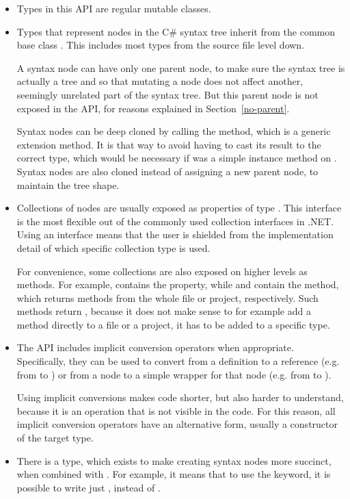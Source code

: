 \begin{itemize}
	
\item Types in this \ac{API} are regular mutable classes.

\item Types that represent nodes in the C\# syntax tree inherit from the common base class . This includes most types from the source file level down.

A syntax node can have only one parent node, to make sure the syntax tree is actually a tree and so that mutating a node does not affect another, seemingly unrelated part of the syntax tree. But this parent node is not exposed in the \ac{API}, for reasons explained in Section~\ref{no-parent}.

Syntax nodes can be deep cloned by calling the  method, which is a generic extension method. It is that way to avoid having to cast its result to the correct type, which would be necessary if  was a simple instance method on . Syntax nodes are also cloned instead of assigning a new parent node, to maintain the tree shape.

\item Collections of nodes are usually exposed as properties of type . This interface is the most flexible out of the commonly used collection interfaces in .NET. Using an interface means that the user is shielded from the implementation detail of which specific collection type is used.

For convenience, some collections are also exposed on higher levels as methods. For example,  contains the  property, while  and  contain the  method, which returns methods from the whole file or project, respectively. Such methods return , because it does not make sense to for example add a method directly to a file or a project, it has to be added to a specific type.

\item The \ac{API} includes implicit conversion operators when appropriate. Specifically, they can be used to convert from a definition to a reference (e.g. from  to ) or from a node to a simple wrapper for that node (e.g. from  to ).

Using implicit conversions makes code shorter, but also harder to understand, because it is an operation that is not visible in the code. For this reason, all implicit conversion operators have an alternative form, usually a constructor of the target type.

\item There is a  type, which exists to make creating syntax nodes more succinct, when combined with . For example, it means that to use the  keyword, it is possible to write just , instead of  .

\end{itemize}

